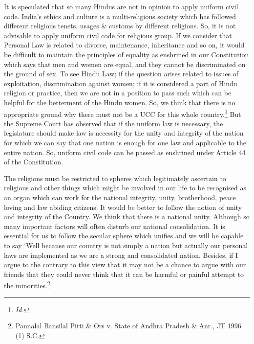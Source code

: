 \begin{multicols}{2}
\noi
It is speculated that so many Hindus are not in opinion to apply uniform civil code. India’s
ethics and culture is a multi-religious society which has followed different religious tenets,
usages \& customs by different religions. So, it is not advisable to apply uniform civil code for
religious group. If we consider that Personal Law is related to divorce, maintenance,
inheritance and so on, it would be difficult to maintain the principles of equality as enshrined
in our Constitution which says that men and women are equal, and they cannot be
discriminated on the ground of sex. To see Hindu Law; if the question arises related to issues
of exploitation, discrimination against women; if it is considered a part of Hindu religion or
practice, then we are not in a position to pass such which can be helpful for the betterment of
the Hindu women. So, we think that there is no appropriate ground why there must not be a
UCC for this whole country.\footnote{\it Id.} But the Supreme Court has observed that if the uniform law is
necessary, the legislature should make law is necessity for the unity and integrity of the
nation for which we can say that one nation is enough for one law and applicable to the entire nation. So, uniform civil code can be passed as enshrined under Article 44 of the
Constitution. 

\noi
The religions must be restricted to spheres which legitimately ascertain to religious and other
things which might be involved in our life to be recognised as an organ which can work for
the national integrity, unity, brotherhood, peace loving and law abiding citizens. It would be
better to follow the notion of unity and integrity of the Country. We think that there is a
national unity. Although so many important factors will often disturb our national
consolidation. It is essential for us to follow the secular sphere which unifies and we will be
capable to say ‘Well because our country is not simply a nation but actually our personal laws
are implemented as we are a strong and consolidated nation. Besides, if I argue to the
contrary to this view that it may not be a chance to argue with our friends that they could
never think that it can be harmful or painful attempt to the minorities.\footnote{ Pannalal Bansilal Pitti \& Ors v. State of Andhra Pradesh \& Anr., JT 1996 (1) S.C.}


\end{multicols}
